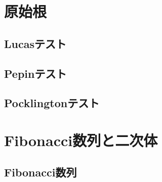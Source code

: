 \section{原始根}
\subsection{Lucasテスト}

\subsection{Pepinテスト}

\subsection{Pocklingtonテスト}


\section{Fibonacci数列と二次体}
\subsection{Fibonacci数列}


\newpage
\printindex



